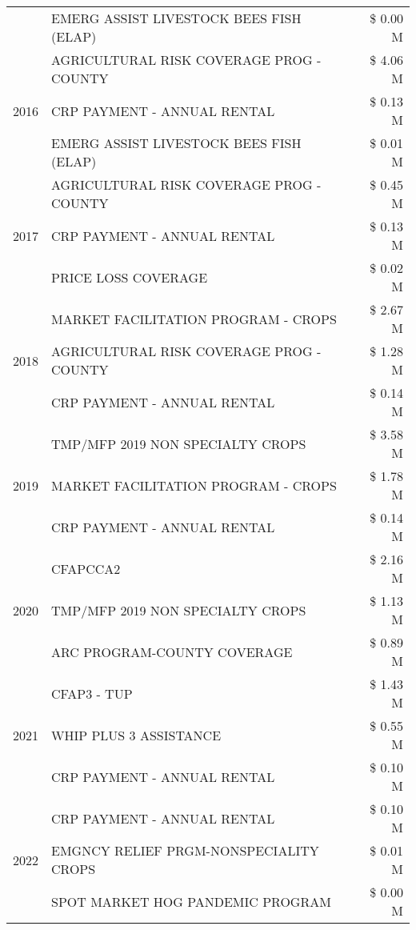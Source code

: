 \begin{tabular}{llr}
 & EMERG ASSIST LIVESTOCK BEES FISH (ELAP) & \$ 0.00 M \\
\cline{1-3}
\multirow[t]{3}{*}{2016} & AGRICULTURAL RISK COVERAGE PROG - COUNTY & \$ 4.06 M \\
 & CRP PAYMENT - ANNUAL RENTAL & \$ 0.13 M \\
 & EMERG ASSIST LIVESTOCK BEES FISH (ELAP) & \$ 0.01 M \\
\cline{1-3}
\multirow[t]{3}{*}{2017} & AGRICULTURAL RISK COVERAGE PROG - COUNTY & \$ 0.45 M \\
 & CRP PAYMENT - ANNUAL RENTAL & \$ 0.13 M \\
 & PRICE LOSS COVERAGE & \$ 0.02 M \\
\cline{1-3}
\multirow[t]{3}{*}{2018} & MARKET FACILITATION PROGRAM - CROPS & \$ 2.67 M \\
 & AGRICULTURAL RISK COVERAGE PROG - COUNTY & \$ 1.28 M \\
 & CRP PAYMENT - ANNUAL RENTAL & \$ 0.14 M \\
\cline{1-3}
\multirow[t]{3}{*}{2019} & TMP/MFP 2019 NON SPECIALTY CROPS & \$ 3.58 M \\
 & MARKET FACILITATION PROGRAM - CROPS & \$ 1.78 M \\
 & CRP PAYMENT - ANNUAL RENTAL & \$ 0.14 M \\
\cline{1-3}
\multirow[t]{3}{*}{2020} & CFAPCCA2 & \$ 2.16 M \\
 & TMP/MFP 2019 NON SPECIALTY CROPS & \$ 1.13 M \\
 & ARC PROGRAM-COUNTY COVERAGE & \$ 0.89 M \\
\cline{1-3}
\multirow[t]{3}{*}{2021} & CFAP3 - TUP & \$ 1.43 M \\
 & WHIP PLUS 3 ASSISTANCE & \$ 0.55 M \\
 & CRP PAYMENT - ANNUAL RENTAL & \$ 0.10 M \\
\cline{1-3}
\multirow[t]{3}{*}{2022} & CRP PAYMENT - ANNUAL RENTAL & \$ 0.10 M \\
 & EMGNCY RELIEF PRGM-NONSPECIALITY CROPS & \$ 0.01 M \\
 & SPOT MARKET HOG PANDEMIC PROGRAM & \$ 0.00 M \\
\cline{1-3}
\bottomrule
\end{tabular}
